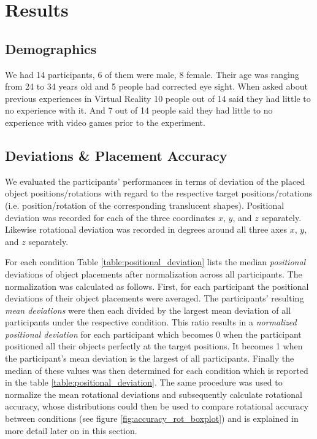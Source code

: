 \section{Results}\label{chapterResults}

\subsection{Demographics}
We had 14 participants, 6 of them were male, 8 female. 
Their age was ranging from 24 to 34 years old and 5 people had corrected eye sight.
When asked about previous experiences in Virtual 
Reality 10 people out of 14 said they had little to no experience with it.
And 7 out of 14 people said they had little to no experience with video games prior to the experiment.

\subsection{Deviations \& Placement Accuracy}
We evaluated the participants' performances in terms of deviation of the placed object positions/rotations with regard to the respective target positions/rotations (i.e. position/rotation of the corresponding translucent shapes).
Positional deviation was recorded for each of the three coordinates $x$, $y$, and $z$ separately.
Likewise rotational deviation was recorded in degrees around all three axes $x$, $y$, and $z$ separately. %

For each condition Table \ref{table:positional_deviation} lists the median \textit{positional} deviations of object placements after normalization across all participants.
The normalization was calculated as follows.
First, for each participant the positional deviations of their object placements were averaged.
The participants' resulting \textit{mean deviations} were then each divided by the largest mean deviation of all participants under the respective condition.
This ratio results in a \textit{normalized positional deviation} for each participant which becomes 0 when the participant positioned all their objects perfectly at the target positions.
It becomes 1 when the participant's mean deviation is the largest of all participants.
Finally the median of these values was then determined for each condition which is reported in the table \ref{table:positional_deviation}.
The same procedure was used to normalize the mean rotational deviations and subsequently calculate rotational accuracy, whose distributions could then be used to compare rotational accuracy between conditions (see figure \ref{fig:accuracy_rot_boxplot}) and is explained in more detail later on in this section.

